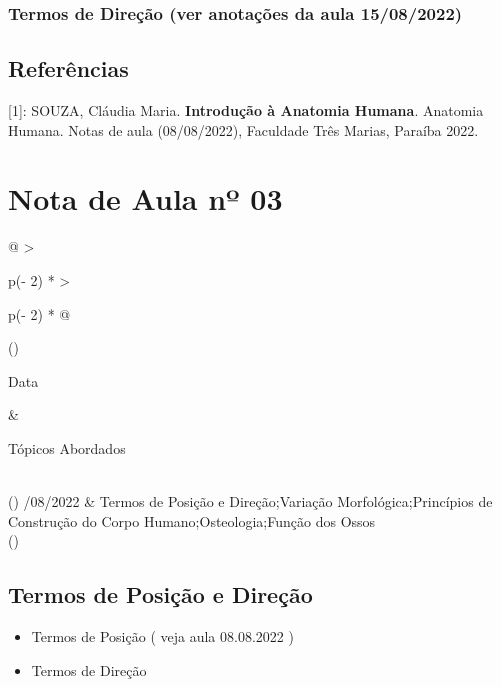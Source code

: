 \documentclass[
]{book}
\providecommand{\tightlist}{%
  \setlength{\itemsep}{0pt}\setlength{\parskip}{0pt}}
\begin{document}
\hypertarget{termos-de-direuxe7uxe3o-ver-anotauxe7uxf5es-da-aula-15082022}{%
\subsubsection{Termos de Direção (ver anotações da aula 15/08/2022)}\label{termos-de-direuxe7uxe3o-ver-anotauxe7uxf5es-da-aula-15082022}}

\hypertarget{referuxeancias}{%
\subsection{Referências}\label{referuxeancias}}

{[}1{]}: SOUZA, Cláudia Maria. \textbf{Introdução à Anatomia Humana}. Anatomia Humana. Notas de aula (08/08/2022), Faculdade Três Marias, Paraíba 2022.

\hypertarget{nota-de-aula-nuxba-03}{%
\section{Nota de Aula nº 03}\label{nota-de-aula-nuxba-03}}

\begin{longtable}[]{@{}
  >{\raggedright\arraybackslash}p{(\columnwidth - 2\tabcolsep) * }
  >{\raggedright\arraybackslash}p{(\columnwidth - 2\tabcolsep) * }@{}}
\toprule()
\begin{minipage}[b]{\linewidth}\raggedright
Data
\end{minipage} & \begin{minipage}[b]{\linewidth}\raggedright
Tópicos Abordados
\end{minipage} \\
\midrule()
/08/2022 & Termos de Posição e Direção;Variação Morfológica;Princípios de Construção do Corpo Humano;Osteologia;Função dos Ossos \\
\bottomrule()
\end{longtable}

\hypertarget{termos-de-posiuxe7uxe3o-e-direuxe7uxe3o-1}{%
\subsection{Termos de Posição e Direção}\label{termos-de-posiuxe7uxe3o-e-direuxe7uxe3o-1}}

\begin{itemize}
\tightlist
\item
  Termos de Posição ( veja aula 08.08.2022 )
\item
  Termos de Direção
\end{itemize}
\end{document}

